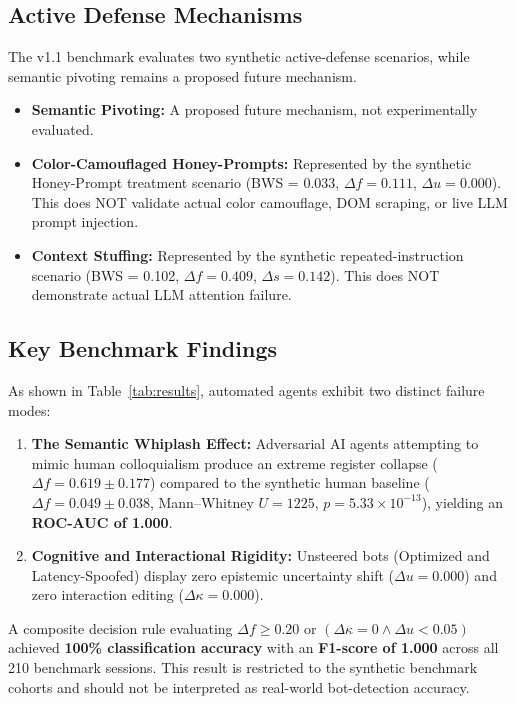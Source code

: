 \documentclass[10pt,a4paper]{article}
\begin{document}
\subsection*{Active Defense Mechanisms}
The v1.1 benchmark evaluates two synthetic active-defense scenarios, while semantic pivoting remains a proposed future mechanism.
\begin{itemize}
    \item \textbf{Semantic Pivoting:} A proposed future mechanism, not experimentally evaluated.
    \item \textbf{Color-Camouflaged Honey-Prompts:} Represented by the synthetic Honey-Prompt treatment scenario (BWS = 0.033, $\Delta f = 0.111$, $\Delta u = 0.000$). This does NOT validate actual color camouflage, DOM scraping, or live LLM prompt injection.
    \item \textbf{Context Stuffing:} Represented by the synthetic repeated-instruction scenario (BWS = 0.102, $\Delta f = 0.409$, $\Delta s = 0.142$). This does NOT demonstrate actual LLM attention failure.
\end{itemize}

\subsection*{Key Benchmark Findings}
As shown in Table~\ref{tab:results}, automated agents exhibit two distinct failure modes:
\begin{enumerate}
    \item \textbf{The Semantic Whiplash Effect:} Adversarial AI agents attempting to mimic human colloquialism produce an extreme register collapse ($\Delta f = 0.619 \pm 0.177$) compared to the synthetic human baseline ($\Delta f = 0.049 \pm 0.038$, Mann--Whitney $U=1225$, $p=5.33 \times 10^{-13}$), yielding an \textbf{ROC-AUC of 1.000}.
    \item \textbf{Cognitive and Interactional Rigidity:} Unsteered bots (Optimized and Latency-Spoofed) display zero epistemic uncertainty shift ($\Delta u = 0.000$) and zero interaction editing ($\Delta \kappa = 0.000$).
\end{enumerate}
A composite decision rule evaluating $\Delta f \ge 0.20$ or $(\Delta \kappa = 0 \land \Delta u < 0.05)$ achieved \textbf{100\% classification accuracy} with an \textbf{F1-score of 1.000} across all 210 benchmark sessions. This result is restricted to the synthetic benchmark cohorts and should not be interpreted as real-world bot-detection accuracy.
\end{document}
